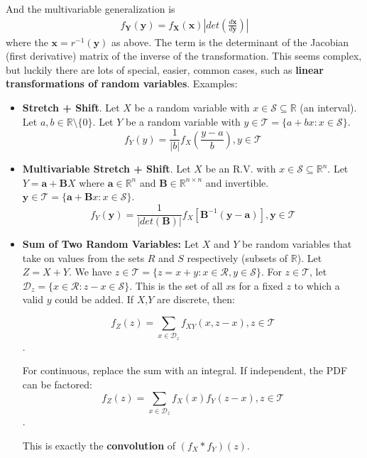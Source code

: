 \documentclass{harvardml}
\theoremstyle{definition}
\theoremstyle{plain}
\newcommand{\R}{\mathbb{R}}
\renewcommand{\v}[1]{\mathbf{#1}}
\begin{document}
		\noindent And the multivariable generalization is 
		\begin{align*}
			f_{\v Y}(\v y) = f_{\v X}(\v x) |det(\frac{d \v x}{d \v y})|
		\end{align*}
		\noindent where the $\v x = r^{-1}(\v y)$ as above.
		The term is the determinant of the Jacobian (first derivative) matrix
		of the inverse of the transformation. This seems complex, but luckily 
        there are lots of special, easier, common cases, such as 
        \textbf{linear transformations of random variables}. Examples:

        \begin{itemize}
            \item \textbf{Stretch + Shift}. Let $X$ be a random
                variable with $x \in \mathcal{S} \subseteq \R$ (an interval).
            	Let $a,b \in \R\setminus\{0\}$. Let $Y$ be a random
            	variable with $y \in \mathcal{T} = 
                \{a + bx : x \in \mathcal{S}\}$.
                $$ f_Y(y) = \frac{1}{|b|}f_X(\frac{y-a}{b}), 
				y \in \mathcal{T}$$
            \item \textbf{Multivariable Stretch + Shift}. 
                Let $X$ be an R.V. with
                $x \in \mathcal{S} \subseteq \R^n$. 
				Let $Y = \v a + \v B X$ where
                $\v a \in \R^n$ and $ \v B \in \R^{n \times n}$ 
				and invertible. $\v y \in \mathcal{T} = 
				\{\v a + \v B x : x \in \mathcal{S}\}$.
            	$$ f_Y(\v y) = \frac{1}{|det(\v B)|}f_X
				[\v B^{-1}(\v y - \v a)],
                \v y \in \mathcal{T}$$

            \item \textbf{Sum of Two Random Variables:}
                    Let $X$ and $Y$ be random variables that take on
                    values from the sets $R$ and $S$ 
                    respectively (subsets of $\R$). Let $Z = X + Y$.
                    We have $z \in \mathcal{T} = 
                    \{z = x + y: x \in \mathcal{R}, y \in \mathcal{S}\}$.
                    For $z \in \mathcal{T}$, let $\mathcal{D}_z =
                    \{x \in \mathcal{R} : z - x \in \mathcal{S}\}$.
                    This is the set of all $x$s for a fixed $z$ to which a
                    valid $y$ could be added. If $X$,$Y$ are discrete, then:

                   	$$ f_Z(z) = \sum_{x \in \mathcal{D}_z} f_{XY}(x,z-x),
                	z \in \mathcal{T}$$.

                   	\noindent For continuous, replace the sum with an integral.
                   	If independent, the PDF can be factored:
                   	$$ f_Z(z) = \sum_{x \in \mathcal{D}_z} f_X(x)f_Y(z-x),
                   	z \in \mathcal{T}$$.

					\noindent This is exactly the \textbf{convolution}
					of $(f_X \ast f_Y)(z)$.
        \end{itemize}
\end{document}
